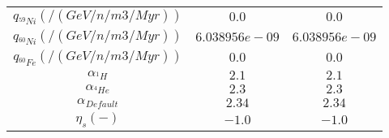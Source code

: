 \begin{tabular}{c |c |c}
	$q_{^{59}Ni} (/(GeV/n/m3/Myr))$ & $0.0$ &$0.0$ \\ 
	$q_{^{60}Ni} (/(GeV/n/m3/Myr))$ & $6.038956e-09$ &$6.038956e-09$ \\ 
	$q_{^{60}Fe} (/(GeV/n/m3/Myr))$ & $0.0$ &$0.0$ \\ 
	$\alpha_{^{1}H}$ & $2.1$ &$2.1$ \\ 
	$\alpha_{^{4}He}$ & $2.3$ &$2.3$ \\ 
	$\alpha_{^{}Default}$ & $2.34$ &$2.34$ \\ 
	$\eta_s  (-)$ & $-1.0$ &$-1.0$ \\ 
\end{tabular}

